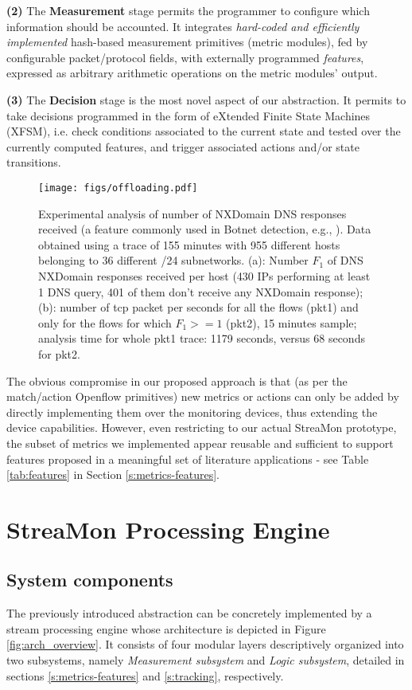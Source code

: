 \documentclass[conference,letterpaper]{sig-alternate-10pt}
\begin{document}
{\bf (2)} The {\bf Measurement} stage permits the programmer to configure which information should be accounted. It integrates {\em hard-coded and efficiently implemented} hash-based measurement primitives (metric modules), fed by configurable packet/protocol fields, with externally programmed {\em features}, expressed as arbitrary arithmetic operations on the metric modules' output. 

{\bf (3)} The {\bf Decision} stage is the most novel aspect of our abstraction. It permits to take decisions programmed in the form of eXtended Finite State Machines (XFSM), i.e. check conditions associated to the current state and tested over the currently computed features, and trigger associated actions and/or state transitions. 

\begin{figure}[!t]
\centering
   \texttt{[image: figs/offloading.pdf]}
\caption{Experimental analysis of number of NXDomain DNS responses received (a feature commonly used in Botnet detection, e.g., \cite{confickerc}). Data obtained using a trace of 155 minutes with 955 different hosts belonging to 36 different /24 subnetworks. (a): Number $F_1$ of DNS NXDomain responses received per host (430 IPs performing at least 1 DNS query, 401 of them don't receive any NXDomain response); (b): number of tcp packet per seconds for all the flows (pkt1) and only for the flows for which $F_1 >= 1$ (pkt2), 15 minutes sample; analysis time for whole pkt1 trace: 1179 seconds, versus 68 seconds for pkt2.}
\vspace*{-.5cm}
\label{fig:offloading}
\end{figure}

The obvious compromise in our proposed approach is that (as per the match/action Openflow primitives) new metrics or actions can only be added by directly implementing them over the monitoring devices, thus extending the device capabilities. However, even restricting to our actual StreaMon prototype, the subset of metrics we implemented appear reusable and sufficient to support features proposed in a meaningful set of literature applications - see Table \ref{tab:features} in Section \ref{s:metrics-features}.



\section{StreaMon Processing Engine}
\label{s:at-a-glance}

\subsection{System components}
The previously introduced abstraction can be concretely implemented by a stream processing engine whose architecture is depicted in Figure \ref{fig:arch_overview}. It consists of four modular layers descriptively organized into two subsystems, namely {\em Measurement subsystem} and {\em Logic subsystem}, detailed in sections \ref{s:metrics-features} and \ref{s:tracking}, respectively.
\end{document}
